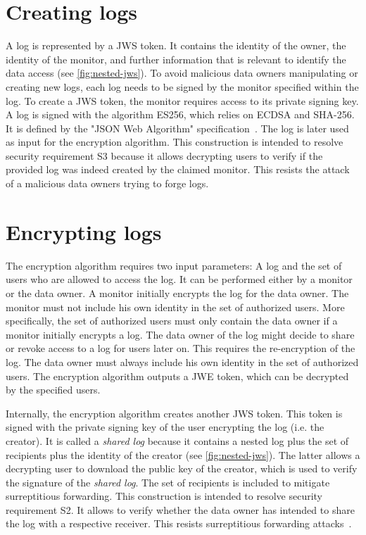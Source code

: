 \documentclass[../main.tex]{subfiles}
\begin{document}
\section{Creating logs}
\label{sec:signing}
A log is represented by a JWS token.
It contains the identity of the owner, the identity of the monitor, and further information that is relevant to identify the data access (see \cref{fig:nested-jws}).
To avoid malicious data owners manipulating or creating new logs, each log needs to be signed by the monitor specified within the log.
To create a JWS token, the monitor requires access to its private signing key.
A log is signed with the algorithm ES256, which relies on ECDSA and SHA-256.
It is defined by the "JSON Web Algorithm" specification~\cite{JWA2015}.
The log is later used as input for the encryption algorithm.
This construction is intended to resolve security requirement S3 because it allows decrypting users to verify if the provided log was indeed created by the claimed monitor.
This resists the attack of a malicious data owners trying to forge logs.

\section{Encrypting logs}\label{sec:encrypting}

The encryption algorithm requires two input parameters: A log and the set of users who are allowed to access the log.
It can be performed either by a monitor or the data owner.
A monitor initially encrypts the log for the data owner.
The monitor must not include his own identity in the set of authorized users.
More specifically, the set of authorized users must only contain the data owner if a monitor initially encrypts a log.
The data owner of the log might decide to share or revoke access to a log for users later on.
This requires the re-encryption of the log.
The data owner must always include his own identity in the set of authorized users.
The encryption algorithm outputs a JWE token, which can be decrypted by the specified users.

Internally, the encryption algorithm creates another JWS token.
This token is signed with the private signing key of the user encrypting the log (i.e. the creator).
It is called a \emph{shared log} because it contains a nested log plus the set of recipients plus the identity of the creator (see \cref{fig:nested-jws}).
The latter allows a decrypting user to download the public key of the creator, which is used to verify the signature of the \emph{shared log}.
The set of recipients is included to mitigate surreptitious forwarding.
This construction is intended to resolve security requirement S2.
It allows to verify whether the data owner has intended to share the log with a respective receiver.
This resists surreptitious forwarding attacks~\cite{Davis2001}.
\end{document}
